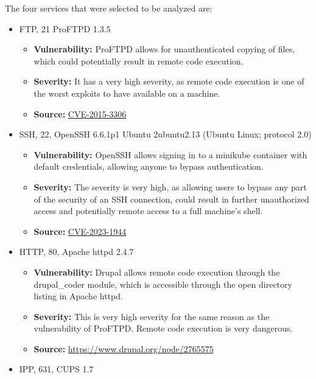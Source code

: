 The four services that were selected to be analyzed are:
\begin{itemize}
    \item FTP, 21 ProFTPD 1.3.5
          \begin{itemize}
              \item \textbf{Vulnerability:} ProFTPD allows for unauthenticated copying of files, which could potentially result in remote code execution.
              \item \textbf{Severity:} It has a very high severity, as remote code execution is one of the worst exploits to have available on a machine.
              \item \textbf{Source:} \href{https://cve.mitre.org/cgi-bin/cvename.cgi?name=CVE-2015-3306}{CVE-2015-3306}
          \end{itemize}
    \item SSH, 22, OpenSSH 6.6.1p1 Ubuntu 2ubuntu2.13 (Ubuntu Linux; protocol 2.0)
          \begin{itemize}
              \item \textbf{Vulnerability:} OpenSSH allows signing in to a minikube container with default credentials, allowing anyone to bypass authentication.
              \item \textbf{Severity:} The severity is very high, as allowing users to bypass any part of the security of an SSH connection, could result in further unauthorized access and potentially remote access to a full machine's shell.
              \item \textbf{Source:} \href{https://cve.mitre.org/cgi-bin/cvename.cgi?name=CVE-2023-1944}{CVE-2023-1944}
          \end{itemize}
    \item HTTP, 80, Apache httpd 2.4.7
          \begin{itemize}
              \item \textbf{Vulnerability:} Drupal allows remote code execution through the drupal\_coder module, which is accessible through the open directory listing in Apache httpd.
              \item \textbf{Severity:} This is very high severity for the same reason as the vulnerability of ProFTPD. Remote code execution is very dangerous.
              \item \textbf{Source:} \href{https://www.drupal.org/node/2765575}{https://www.drupal.org/node/2765575}
          \end{itemize}
    \item IPP, 631, CUPS 1.7

\end{itemize}

